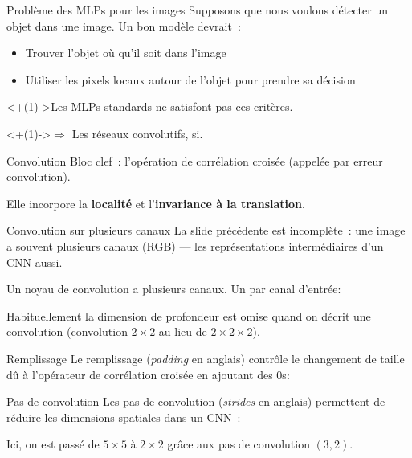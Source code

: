 \begin{frame}{Problème des MLPs pour les images}
  Supposons que nous voulons détecter un objet dans une image. Un bon modèle devrait~:
  \begin{itemize}[<+(1)->]
    \item Trouver l'objet où qu'il soit dans l'image
    \item Utiliser les pixels locaux autour de l'objet pour prendre sa décision
  \end{itemize}

  \onslide<+(1)->{Les MLPs standards ne satisfont pas ces critères.}

  \onslide<+(1)->{$\Rightarrow$ Les réseaux convolutifs, si.}
\end{frame}

\begin{frame}{Convolution}
  Bloc clef~: l'opération de corrélation croisée (appelée par erreur convolution).

  Elle incorpore la \textbf{localité} et l'\textbf{invariance à la translation}.

\end{frame}

\begin{frame}{Convolution sur plusieurs canaux}
  La slide précédente est incomplète~: une image a souvent plusieurs canaux (RGB) --- les représentations intermédiaires d'un CNN aussi.

  Un noyau de convolution a plusieurs canaux. Un par canal d'entrée:


  Habituellement la dimension de profondeur est omise quand on décrit une convolution (convolution $2 \times 2$ au lieu de $2 \times 2 \times 2$).
\end{frame}

\begin{frame}{Remplissage}
  Le remplissage (\textit{padding} en anglais) contrôle le changement de taille dû à l'opérateur de corrélation croisée en ajoutant des $0$s:

\end{frame}

\begin{frame}{Pas de convolution}
  Les pas de convolution (\textit{strides} en anglais) permettent de réduire les dimensions spatiales dans un CNN~:


  Ici, on est passé de $5 \times 5$ à $2 \times 2$ grâce aux pas de convolution $(3, 2)$.
\end{frame}

